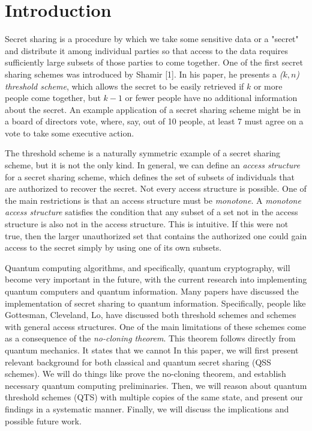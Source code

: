 \chapter{Introduction}

Secret sharing is a procedure by which we take some sensitive data or a "secret" and distribute it among individual parties so that access to the data requires sufficiently large subsets of those parties to come together. One of the first secret sharing schemes was introduced by Shamir [1]. In his paper, he presents a \textit{($k,n$) threshold scheme}, which allows the secret to be easily retrieved if $k$ or more people come together, but $k-1$ or fewer people have no additional information about the secret. An example application of a secret sharing scheme might be in a board of directors vote, where, say, out of 10 people, at least 7 must agree on a vote to take some executive action.

The threshold scheme is a naturally symmetric example of a secret sharing scheme, but it is not the only kind. In general, we can define an \textit{access structure} for a secret sharing scheme, which defines the set of subsets of individuals that are authorized to recover the secret. Not every access structure is possible. One of the main restrictions is that an access structure must be \textit{monotone}. A \textit{monotone access structure} satisfies the condition that any subset of a set not in the access structure is also not in the access structure. This is intuitive. If this were not true, then the larger unauthorized set that contains the authorized one could gain access to the secret simply by using one of its own subsets. 

Quantum computing algorithms, and specifically, quantum cryptography, will become very important in the future, with the current research into implementing quantum computers and quantum information. Many papers have discussed the implementation of secret sharing to quantum information. Specifically, people like Gottesman, Cleveland, Lo, have discussed both threshold schemes and schemes with general access structures. One of the main limitations of these schemes come as a consequence of the \textit{no-cloning theorem}. This theorem follows directly from quantum mechanics. It states that we cannot In this paper, we will first present relevant background for both classical and quantum secret sharing (QSS schemes). We will do things like prove the no-cloning theorem, and establish necessary quantum computing preliminaries. Then, we will reason about quantum threshold schemes (QTS) with multiple copies of the same state, and present our findings in a systematic manner. Finally, we will discuss the implications and possible future work.